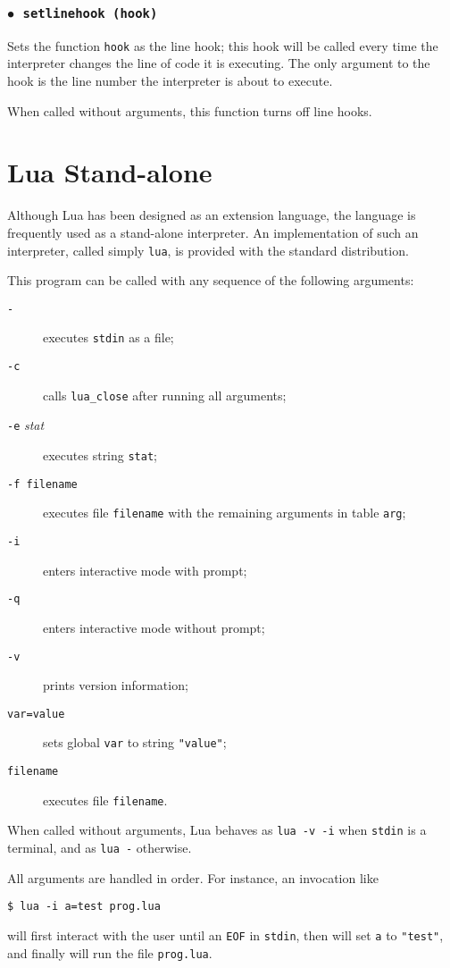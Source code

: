 \documentclass[11pt]{article}
\newcommand{\T}[1]{{\tt #1}}
\newcommand{\Index}[1]{#1\index{#1}}
\newcommand{\Deffunc}[1]{\index{#1}}
\newcommand{\ff}{$\bullet$\ }
\begin{document}
\subsubsection*{\ff \T{setlinehook (hook)}}\Deffunc{setlinehook}

Sets the function \verb|hook| as the line hook;
this hook will be called every time the interpreter changes
the line of code it is executing.
The only argument to the hook is the line number the interpreter
is about to execute.

When called without arguments,
this function turns off line hooks.


\section{\Index{Lua Stand-alone}} \label{lua-sa}

Although Lua has been designed as an extension language,
the language is frequently used as a stand-alone interpreter.
An implementation of such an interpreter,
called simply \verb|lua|,
is provided with the standard distribution.

This program can be called with any sequence of the following arguments:
\begin{description}
\item[\T{-}] executes \verb|stdin| as a file;
\item[\T{-c}] calls \verb|lua_close| after running all arguments;
\item[\T{-e} \rm\emph{stat}] executes string \verb|stat|;
\item[\T{-f filename}] executes file \verb|filename| with the
remaining arguments in table \verb|arg|;
\item[\T{-i}] enters interactive mode with prompt;
\item[\T{-q}] enters interactive mode without prompt;
\item[\T{-v}] prints version information;
\item[\T{var=value}] sets global \verb|var| to string \verb|"value"|;
\item[\T{filename}] executes file \verb|filename|.
\end{description}
When called without arguments,
Lua behaves as \verb|lua -v -i| when \verb|stdin| is a terminal,
and as \verb|lua -| otherwise.

All arguments are handled in order.
For instance, an invocation like
\begin{verbatim}
$ lua -i a=test prog.lua
\end{verbatim}
will first interact with the user until an \verb|EOF| in \verb|stdin|,
then will set \verb|a| to \verb|"test"|,
and finally will run the file \verb|prog.lua|.
\end{document}
